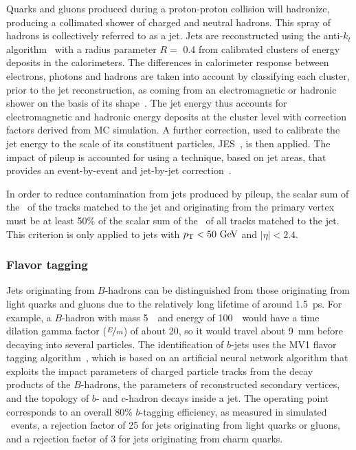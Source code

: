 Quarks and gluons produced during a proton-proton collision will hadronize,
producing a collimated shower of charged and neutral hadrons.
This spray of hadrons is collectively referred to as a jet.
Jets are reconstructed using the anti-$k_{t}$
algorithm~\cite{Cacciari:2008gp, Cacciari:2005hq} with a radius
parameter $R = $ 0.4 from calibrated clusters of energy deposits in
the calorimeters.
The differences in calorimeter response between electrons, photons and hadrons
are taken into account by classifying each cluster, prior to the jet
reconstruction, as coming from an electromagnetic or hadronic shower on the
basis of its shape~\cite{JES}.
The jet energy thus accounts for electromagnetic and hadronic energy deposits
at the cluster level with correction factors derived from MC simulation.
A further correction, used to calibrate the jet energy to the scale of its
constituent particles, JES~\cite{JES,JES2}, is then applied.
The impact of pileup is accounted for using a technique, based on jet areas,
that provides an event-by-event and jet-by-jet
correction~\cite{Cacciari:2007fd}.

In order to reduce contamination from jets produced by pileup,
the scalar sum of the \pt\ of the tracks matched to the jet and
originating from the primary vertex must be at least 50\% of the
scalar sum of the \pt\ of all tracks matched to the jet.
This criterion is only applied to jets with $\pt < 50 \GeV$ and
$|\eta| < 2.4$.

\FloatBarrier
\subsubsection{Flavor tagging} 
\label{sec:flavor_tagging}

Jets originating from $B$-hadrons can be distinguished from those originating
from light quarks and gluons due to the relatively long lifetime
of around 1.5~ps.
For example, a $B$-hadron with mass 5~\GeV\ and energy of 100~\GeV\ would have
a time dilation gamma factor ($\nicefrac{E}{m}$) of about 20, so it would
travel about 9~mm before decaying into several particles.
The identification of $b$-jets uses the MV1 flavor tagging
algorithm~\cite{ATLAS-CONF-2014-004, ATLAS-CONF-2014-046}, which is
based on an artificial neural network algorithm that exploits the impact
parameters of charged particle tracks from the decay products of the
$B$-hadrons, the parameters of reconstructed
secondary vertices, and the topology of $b$- and $c$-hadron decays inside a
jet.
The operating point corresponds to an overall 80\% $b$-tagging efficiency, as
measured in simulated \TTBAR\ events, a rejection factor of 25 for jets
originating from light quarks or gluons, and a rejection factor of
3 for jets originating from charm quarks.

